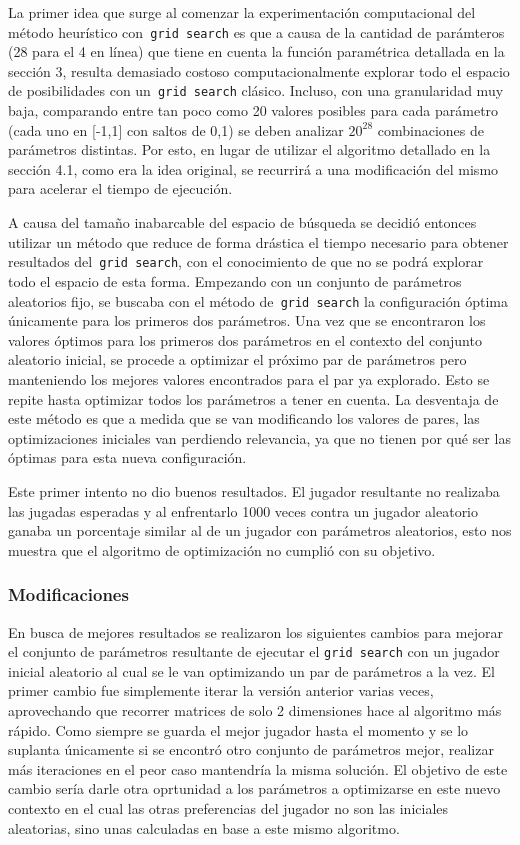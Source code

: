 \documentclass[A4paper,oneside,fleqn,11pt]{article}
\theoremstyle{definition}
\begin{document}
La primer idea que surge al comenzar la experimentación computacional del método heurístico con\texttt{ grid search} es que a causa de la cantidad de parámteros (28 para el 4 en línea) que tiene en cuenta la función paramétrica detallada en la sección 3, resulta demasiado costoso computacionalmente explorar todo el espacio de posibilidades con un\texttt{ grid search} clásico. Incluso, con una granularidad muy baja, comparando entre tan poco como 20 valores posibles para cada parámetro (cada uno en [-1,1] con saltos de 0,1) se deben analizar $ 20^{28}$ combinaciones de parámetros distintas. Por esto, en lugar de utilizar el algoritmo detallado en la sección 4.1, como era la idea original, se recurrirá a una modificación del mismo para acelerar el tiempo de ejecución.

A causa del tamaño inabarcable del espacio de búsqueda se decidió entonces utilizar un método que reduce de forma drástica el tiempo necesario para obtener resultados del\texttt{ grid search}, con el conocimiento de que no se podrá explorar todo el espacio de esta forma. Empezando con un conjunto de parámetros aleatorios fijo, se buscaba con el método de\texttt{ grid search} la configuración óptima únicamente para los primeros dos parámetros. Una vez que se encontraron los valores óptimos para los primeros dos parámetros en el contexto del conjunto aleatorio inicial, se procede a optimizar el próximo par de parámetros pero manteniendo los mejores valores encontrados para el par ya explorado. Esto se repite hasta optimizar todos los parámetros a tener en cuenta. La desventaja de este método es que a medida que se van modificando los valores de pares, las optimizaciones iniciales van perdiendo relevancia, ya que no tienen por qué ser las óptimas para esta nueva configuración.

Este primer intento no dio buenos resultados. El jugador resultante no realizaba las jugadas esperadas y al enfrentarlo 1000 veces contra un jugador aleatorio ganaba un porcentaje similar al de un jugador con parámetros aleatorios, esto nos muestra que el algoritmo de optimización no cumplió con su objetivo.


\subsubsection{Modificaciones}

En busca de mejores resultados se realizaron los siguientes cambios para mejorar el conjunto de parámetros resultante de ejecutar el \texttt{grid search} con un jugador inicial aleatorio al cual se le van optimizando un par de parámetros a la vez. El primer cambio fue simplemente iterar la versión anterior varias veces, aprovechando que recorrer matrices de solo 2 dimensiones hace al algoritmo más rápido. Como siempre se guarda el mejor jugador hasta el momento y se lo suplanta únicamente si se encontró otro conjunto de parámetros mejor, realizar más iteraciones en el peor caso mantendría la misma solución. El objetivo de este cambio sería darle otra oprtunidad a los parámetros a optimizarse en este nuevo contexto en el cual las otras preferencias del jugador no son las iniciales aleatorias, sino unas calculadas en base a este mismo algoritmo. 
\end{document}
